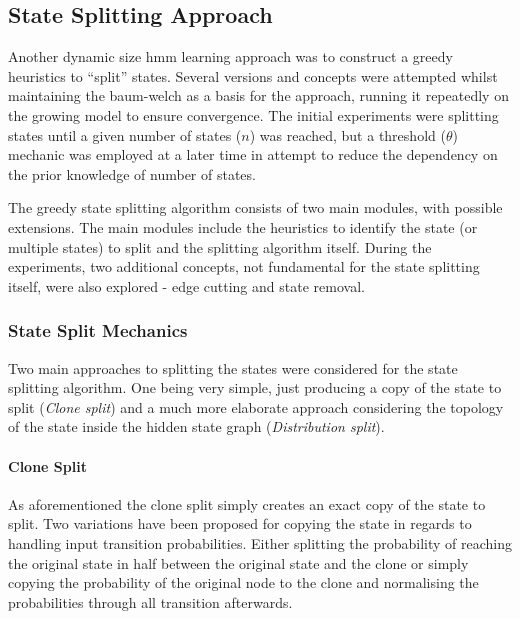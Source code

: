 \subsection{State Splitting Approach}

Another dynamic size \gls{hmm} learning approach was to construct a greedy heuristics to ``split'' states. Several versions and concepts were attempted whilst maintaining the \gls{baum-welch} as a basis for the approach, running it repeatedly on the growing model to ensure convergence. The initial experiments were splitting states until a given number of states ($n$) was reached, but a threshold ($\theta$) mechanic was employed at a later time in attempt to reduce the dependency on the prior knowledge of number of states.

The greedy state splitting algorithm consists of two main modules, with possible extensions. The main modules include the heuristics to identify the state (or multiple states) to split and the splitting algorithm itself. During the experiments, two additional concepts, not fundamental for the state splitting itself, were also explored - edge cutting and state removal.

\subsubsection{State Split Mechanics}
Two main approaches to splitting the states were considered for the state splitting algorithm. One being very simple, just producing a copy of the state to split (\emph{Clone split}) and a much more elaborate approach considering the topology of the state inside the hidden state graph (\emph{Distribution split}).

\paragraph{Clone Split}
As aforementioned the clone split simply creates an exact copy of the state to split. Two variations have been proposed for copying the state in regards to handling input transition probabilities. Either splitting the probability of reaching the original state in half between the original state and the clone or simply copying the probability of the original node to the clone and normalising the probabilities through all transition afterwards.

